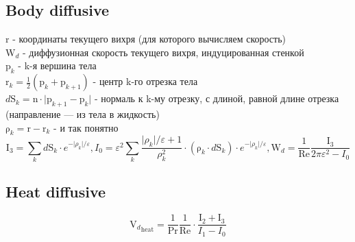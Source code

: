 \documentclass[14pt]{extreport}
\newcommand{\br}[1]{\boldsymbol{\mathrm{#1}}}
\newcommand{\Reyn}{\text{Re}}
\newcommand{\Pran}{\text{Pr}}
\begin{document}
\subsection{Body diffusive}

$\br r$ - координаты текущего вихря (для которого вычисляем скорость) \\
$\br W_d$ - диффузионная скорость текущего вихря, индуцированная стенкой \\
$\br p_k$ - k-я вершина тела \\
$\br r_k = \frac{1}{2}(\br p_k + \br p_{k+1})$ - центр k-го отрезка тела \\
$d \br S_k = \br n \cdot\lvert\br p_{k+1} - \br p_k \rvert$ - нормаль к k-му отрезку, с длиной, равной длине отрезка (направление --- из тела в жидкость) \\
$\br{\rho}_k = \br r - \br r_k$ - и так понятно \\

\begin{equation*}
\br I_3 = {\sum\limits_k d\br S_k\cdot e^{-\lvert\rho_k\rvert/\varepsilon}},
I_0 = {\varepsilon^2\sum\limits_k \dfrac{\lvert\rho_k\rvert /\varepsilon +1}{\rho_k^2}
\cdot(\br\rho_k \cdot d\br S_k)\cdot e^{-\lvert\rho_k\rvert/\varepsilon}},
\br W_d = \dfrac{1}{\Reyn} \dfrac{\br I_3}{2\pi\varepsilon^2 - I_0}
\end{equation*}

\begin{center}\setlength\fboxsep{0pt}
\setlength\fboxrule{0.5pt}
\fbox{}
\end{center}

\subsection{Heat diffusive}

\begin{equation*}
{\br V_d}_\text{heat} = \frac {1}{\Pran}\frac{1}{\Reyn} \cdot\frac{\br I_2 + \br I_3}{I_1 - I_0}
\end{equation*}

\end{document}
